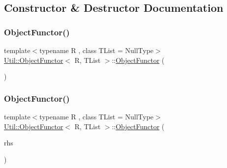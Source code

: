 \subsection{Constructor \& Destructor Documentation}
\mbox{\label{classUtil_1_1ObjectFunctor_ac08a0820c0cf21a61abb6da3ede541d4}} 
\subsubsection{\texorpdfstring{ObjectFunctor()}{ObjectFunctor()}\hspace{0.1cm}{\footnotesize\ttfamily [1/15]}}
{\footnotesize\ttfamily template$<$typename R , class T\+List  = Null\+Type$>$ \\
\mbox{\hyperlink{classUtil_1_1ObjectFunctor}{Util\+::\+Object\+Functor}}$<$ R, T\+List $>$\+::\mbox{\hyperlink{classUtil_1_1ObjectFunctor}{Object\+Functor}} (\begin{DoxyParamCaption}{ }\end{DoxyParamCaption})\hspace{0.3cm}{\ttfamily [inline]}}

\mbox{\label{classUtil_1_1ObjectFunctor_a2d42842ec3d69b317aaaafd65cd9e2fd}} 
\subsubsection{\texorpdfstring{ObjectFunctor()}{ObjectFunctor()}\hspace{0.1cm}{\footnotesize\ttfamily [2/15]}}
{\footnotesize\ttfamily template$<$typename R , class T\+List  = Null\+Type$>$ \\
\mbox{\hyperlink{classUtil_1_1ObjectFunctor}{Util\+::\+Object\+Functor}}$<$ R, T\+List $>$\+::\mbox{\hyperlink{classUtil_1_1ObjectFunctor}{Object\+Functor}} (\begin{DoxyParamCaption}\item[{const \mbox{\hyperlink{classUtil_1_1ObjectFunctor}{Object\+Functor}}$<$ R, T\+List $>$ \&}]{rhs }\end{DoxyParamCaption})\hspace{0.3cm}{\ttfamily [inline]}}

